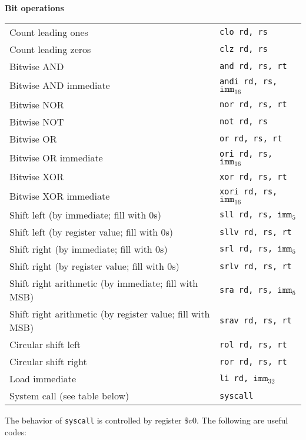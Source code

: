 \documentclass{article}
\newcommand{\pseudo}{{\ensuremath\ast}}
\begin{document}
\vspace*{-1em}
\noindent
\textbf{Bit operations}
\begin{center}
\begin{tabular}{ll}
Count leading ones & {\tt clo rd, rs} \\
Count leading zeros & {\tt clz rd, rs} \\
Bitwise AND & {\tt and rd, rs, rt} \\
Bitwise AND immediate & {\tt andi rd, rs, }$\mathtt{imm}_{16}$ \\
Bitwise NOR & {\tt nor rd, rs, rt} \\
Bitwise NOT & {\tt not rd, rs} \\
Bitwise OR & {\tt or rd, rs, rt} \\
Bitwise OR immediate & {\tt ori rd, rs, }$\mathtt{imm}_{16}$ \\
Bitwise XOR & {\tt xor rd, rs, rt} \\
Bitwise XOR immediate & {\tt xori rd, rs, }$\mathtt{imm}_{16}$ \\
Shift left (by immediate; fill with 0s) & {\tt sll rd, rs, }$\mathtt{imm}_5$ \\
Shift left (by register value; fill with 0s) & {\tt sllv rd, rs, rt} \\
Shift right (by immediate; fill with 0s) & {\tt srl rd, rs, }$\mathtt{imm}_5$ \\
Shift right (by register value; fill with 0s) & {\tt srlv rd, rs, rt} \\
Shift right arithmetic (by immediate; fill with MSB) & {\tt sra rd, rs, }$\mathtt{imm}_5$ \\
Shift right arithmetic (by register value; fill with MSB) & {\tt srav rd, rs, rt} \\
Circular shift left\pseudo & {\tt rol rd, rs, rt} \\
Circular shift right\pseudo & {\tt ror rd, rs, rt} \\
Load immediate\pseudo & {\tt li rd, }$\mathtt{imm}_{32}$ \\
System call (see table below) & {\tt syscall} 
\end{tabular}
\end{center}
The behavior of {\tt syscall} is controlled by register $\$v0$.
The following are useful codes:
\vspace*{-1em}
\end{document}
